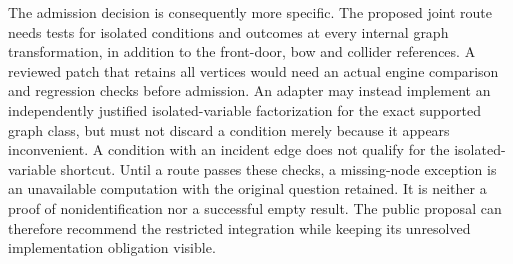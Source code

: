 The admission decision is consequently more specific. The proposed joint
route needs tests for isolated conditions and outcomes at every internal
graph transformation, in addition to the front-door, bow and collider
references. A reviewed patch that retains all vertices would need an actual
engine comparison and regression checks before admission. An adapter may
instead implement an independently justified isolated-variable factorization
for the exact supported graph class, but must not discard a condition merely
because it appears inconvenient. A condition with an incident edge does not
qualify for the isolated-variable shortcut. Until a route passes these
checks, a missing-node exception is an unavailable computation with the
original question retained. It is neither a proof of nonidentification nor
a successful empty result. The public proposal can therefore recommend the
restricted integration while keeping its unresolved implementation obligation
visible.
\label{exec13:isolated-condition-end}
